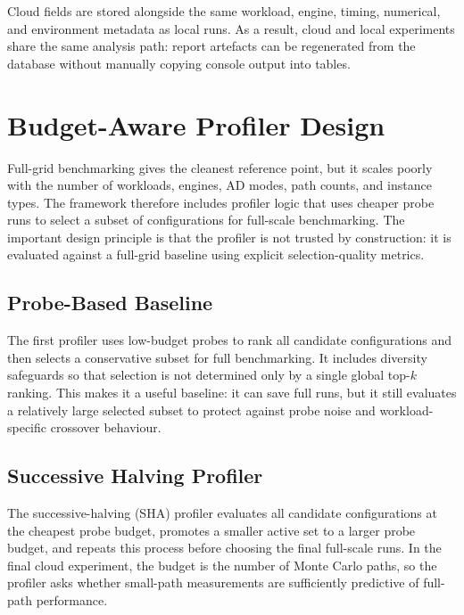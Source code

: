 Cloud fields are stored alongside the same workload, engine, timing, numerical,
and environment metadata as local runs. As a result, cloud and local experiments
share the same analysis path: report artefacts can be regenerated from the
database without manually copying console output into tables.

\section{Budget-Aware Profiler Design}
\label{sec:profiler-design}

Full-grid benchmarking gives the cleanest reference point, but it scales poorly
with the number of workloads, engines, AD modes, path counts, and instance
types. The framework therefore includes profiler logic that uses cheaper probe
runs to select a subset of configurations for full-scale benchmarking. The
important design principle is that the profiler is not trusted by construction:
it is evaluated against a full-grid baseline using explicit selection-quality
metrics.

\subsection{Probe-Based Baseline}
\label{sec:old-profiler-design}

The first profiler uses low-budget probes to rank all candidate configurations
and then selects a conservative subset for full benchmarking. It includes
diversity safeguards so that selection is not determined only by a single global
top-\(k\) ranking. This makes it a useful baseline: it can save full runs, but
it still evaluates a relatively large selected subset to protect against probe
noise and workload-specific crossover behaviour.

\subsection{Successive Halving Profiler}
\label{sec:sha-profiler-design}

The successive-halving (SHA) profiler evaluates all candidate configurations at
the cheapest probe budget, promotes a smaller active set to a larger probe
budget, and repeats this process before choosing the final full-scale runs. In
the final cloud experiment, the budget is the number of Monte Carlo paths, so
the profiler asks whether small-path measurements are sufficiently predictive of
full-path performance.

